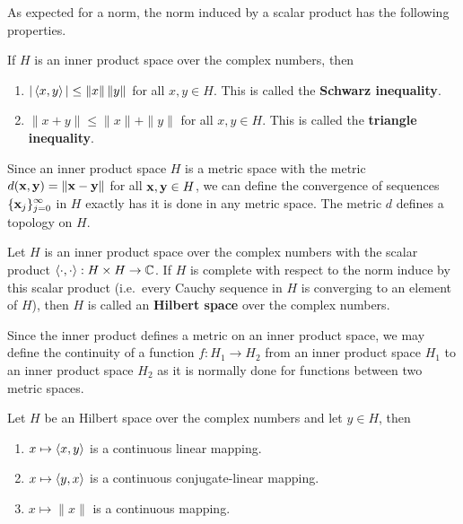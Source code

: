 As expected for a norm, the norm induced by a scalar product has the
following properties.

\begin{theorem}
If $H$ is an inner product space over the complex numbers, then
\begin{enumerate}
\item $|\left\langle{x} , {y}\right\rangle| \leq \|x\|\,\|y\|$ for all $x,y\in H$.  This is
called the {\bfseries Schwarz inequality}.
\item $\|x+y\| \leq \|x\| + \|y\|$ for all $x,y\in H$.  This is
called the {\bfseries triangle inequality}.
\end{enumerate}
\end{theorem}

Since an inner product space $H$ is a metric space with the metric
$d(\mathbf{x},\mathbf{y}) = \|\mathbf{x} - \mathbf{y}\|$ for all $\mathbf{x},\mathbf{y} \in H$,
we can define the convergence of sequences
$\displaystyle \{ \mathbf{x}_j \}_{j=0}^\infty$ in $H$ exactly has it is
done in any metric space.  The metric $d$ defines a topology on $H$.

\begin{defn}
Let $H$ is an inner product space over the complex numbers with the
scalar product $\left\langle{\cdot} , {\cdot}\right\rangle:H\times H \rightarrow \mathbb{C}$.  If $H$
is complete with respect to the norm induce by this scalar product
(i.e.\ every Cauchy sequence in $H$ is converging to an element of
$H$), then $H$ is called an
{\bfseries Hilbert space} over the complex
numbers.
\end{defn}

Since the inner product defines a metric on an inner product space, we
may define the continuity of a function $f:H_1 \to H_2$ from an inner
product space $H_1$ to an inner product space $H_2$ as it is normally
done for functions between two metric spaces.

\begin{prop}
Let $H$ be an Hilbert space over the complex numbers and let
$y\in H$, then
\begin{enumerate}
\item $\displaystyle x \mapsto \left\langle{x} , {y}\right\rangle$ is a continuous linear mapping.
\item $\displaystyle x \mapsto \left\langle{y} , {x}\right\rangle$ is a continuous
conjugate-linear mapping.
\item $\displaystyle x \mapsto \|x\|$ is a continuous mapping.
\end{enumerate}
\end{prop}

